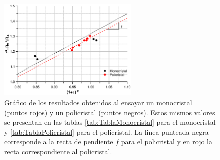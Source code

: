 \documentclass[a4paper,12pt,fleqn,twoside,openany]{book}
\begin{document}
 \begin{figure}[h]
 \centering
 \includegraphics[width=0.6\textwidth]{Img/Resultados/Resistencia/PoliMono2.eps}
 \caption{Gráfico de los resultados obtenidos al ensayar un monocristal (puntos rojos) y un policristal (puntos negros). Estos mismos valores se presentan en las tablas \ref{tab:TablaMonocristal} para el monocristal y \ref{tab:TablaPolicristal} para el policristal. La linea punteada negra corresponde a la recta de pendiente $f$ para el policristal y en rojo la recta correspondiente al policristal.} 
 \label{fig:PoliMono}
 \end{figure}

%     
\end{document}
